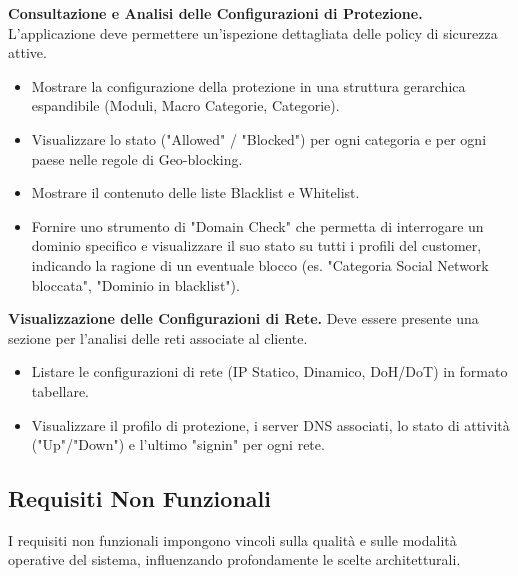 \documentclass[12pt,a4paper,openright,twoside]{book}
\begin{document}
\begin{reqfunz}
    \item \label{req:protection} \textbf{Consultazione e Analisi delle Configurazioni di Protezione.} L'applicazione deve permettere un'ispezione dettagliata delle policy di sicurezza attive.
    \begin{itemize}
        \item Mostrare la configurazione della protezione in una struttura gerarchica espandibile (Moduli, Macro Categorie, Categorie).
        \item Visualizzare lo stato ("Allowed" / "Blocked") per ogni categoria e per ogni paese nelle regole di Geo-blocking.
        \item Mostrare il contenuto delle liste Blacklist e Whitelist.
        \item Fornire uno strumento di "Domain Check" che permetta di interrogare un dominio specifico e visualizzare il suo stato su tutti i profili del customer, indicando la ragione di un eventuale blocco (es. "Categoria Social Network bloccata", "Dominio in blacklist").
    \end{itemize}

    \item \label{req:network} \textbf{Visualizzazione delle Configurazioni di Rete.} Deve essere presente una sezione per l'analisi delle reti associate al cliente.
    \begin{itemize}
        \item Listare le configurazioni di rete (IP Statico, Dinamico, DoH/DoT) in formato tabellare.
        \item Visualizzare il profilo di protezione, i server DNS associati, lo stato di attività ("Up"/"Down") e l'ultimo "signin" per ogni rete.
    \end{itemize}
\end{reqfunz}

\subsection{Requisiti Non Funzionali}
\label{subsec:req_non_funzionali}
I requisiti non funzionali impongono vincoli sulla qualità e sulle modalità operative del sistema, influenzando profondamente le scelte architetturali.
\end{document}
